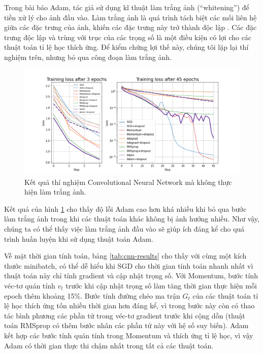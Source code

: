 Trong bài báo Adam, tác giả sử dụng kĩ thuật làm trắng ảnh (``whitening'') để tiền xử lý cho ảnh đầu vào. Làm trắng ảnh là quá trình tách biệt các mối liên hệ giữa các đặc trưng của ảnh, khiến các đặc trưng này trở thành độc lập \cite{kessey2015optimal}. Các đặc trưng độc lập và trùng với trục của các trọng số là một điều kiện có lợi cho các thuật toán tỉ lệ học thích ứng. Để kiểm chứng lợi thế này, chúng tôi lặp lại thí nghiệm trên, nhưng bỏ qua công đoạn làm trắng ảnh.

\begin{figure}[H]
	\centering
	\includegraphics[width=140 mm]{images/cnn-nonwhitened.png}
	\caption{Kết quả thí nghiệm Convolutional Neural Network mà không thực hiện làm trắng ảnh.}
	\label{fig:exp-cnn-nonw}
\end{figure}

Kết quả của hình \ref{fig:exp-cnn-nonw} cho thấy độ lỗi Adam cao hơn khá nhiều khi bỏ qua bước làm trắng ảnh trong khi các thuật toán khác không bị ảnh hưởng nhiều. Như vậy, chúng ta có thể thấy việc làm trắng ảnh đầu vào sẽ giúp ích đáng kể cho quá trình huấn luyện khi sử dụng thuật toán Adam.

Về mặt thời gian tính toán, bảng \ref{tab:cnn-results} cho thấy với cùng một kích thước minibatch, có thể dễ hiểu khi SGD cho thời gian tính toán nhanh nhất vì thuật toán này chỉ tính gradient và cập nhật trọng số. Với Momentum, bước tính véc-tơ quán tính $v_t$ trước khi cập nhật trọng số làm tăng thời gian thực hiện mỗi epoch thêm khoảng 15$\%$. Bước tính đường chéo ma trận $G_t$ của các thuật toán tỉ lệ học thích ứng tốn nhiều thời gian hơn đáng kể, vì trong bước này còn có thao tác bình phương các phần tử trong véc-tơ gradient trước khi cộng dồn (thuật toán RMSprop có thêm bước nhân các phần tử này với hệ số suy biến). Adam kết hợp các bước tính quán tính trong Momentum và thích ứng tỉ lệ học, vì vậy Adam có thời gian thực thi chậm nhất trong tất cả các thuật toán.

